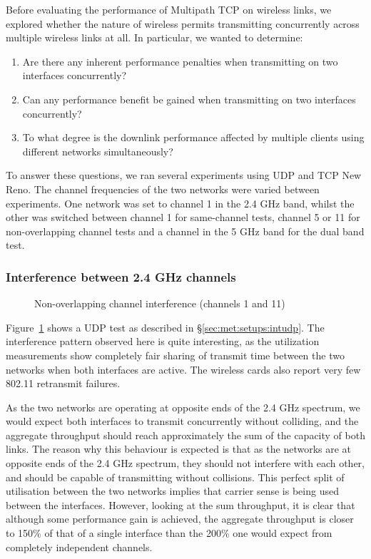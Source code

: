 Before evaluating the performance of Multipath TCP on wireless links, we
explored whether the nature of wireless permits transmitting
concurrently across multiple wireless links at all. In particular, we wanted
to determine:

\begin{enumerate}
  \item Are there any inherent performance penalties when transmitting on two
    interfaces concurrently?
  \item Can any performance benefit be gained when transmitting on two
    interfaces concurrently?
  \item To what degree is the downlink performance affected by multiple clients
    using different networks simultaneously?
\end{enumerate}

To answer these questions, we ran several experiments using UDP and TCP New 
Reno.
The channel frequencies of the two networks were varied between experiments. One
network was set to channel 1 in the 2.4 GHz band, whilst the other
was switched between channel 1 for same-channel tests, channel 5 or 11 for
non-overlapping channel tests and a channel in the 5 GHz band for the dual band 
test. 

\subsubsection{Interference between 2.4 GHz channels}

\begin{figure}[h]
 \centering
 
 \caption{Non-overlapping channel interference (channels 1 and 11)}\label{graph:cc-interference}
\end{figure}

Figure~\ref{graph:cc-interference} shows a UDP test as described in 
\S\ref{sec:met:setups:intudp}.
The interference pattern observed here is quite interesting, as the
utilization measurements show completely fair sharing of transmit time
between the two networks when both interfaces are active. The
wireless cards also report very few 802.11 retransmit failures.

As the two networks are operating at opposite ends of the 2.4 GHz spectrum, we
would expect both interfaces to transmit concurrently without colliding,
and the aggregate throughput should reach approximately the sum of the capacity of
both links. The reason why this behaviour is expected is that as the networks are at opposite ends of the 2.4 GHz spectrum, they should not interfere with each other, and
should be capable of transmitting without collisions. This perfect split of
utilisation between the two networks implies that carrier sense is being used between the interfaces.
However, looking at the sum throughput, it is clear that although some performance gain is
achieved, the aggregate throughput is closer to 150\% of that of a single
interface than the 200\% one would expect from completely independent channels.

